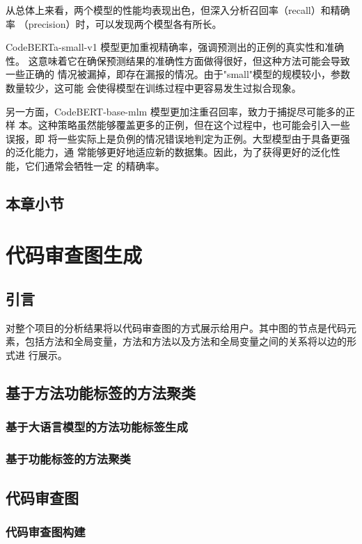 从总体上来看，两个模型的性能均表现出色，但深入分析召回率（recall）和精确率
（precision）时，可以发现两个模型各有所长。

CodeBERTa-small-v1 模型更加重视精确率，强调预测出的正例的真实性和准确性。
这意味着它在确保预测结果的准确性方面做得很好，但这种方法可能会导致一些正确的
情况被漏掉，即存在漏报的情况。由于"small"模型的规模较小，参数数量较少，这可能
会使得模型在训练过程中更容易发生过拟合现象。

另一方面，CodeBERT-base-mlm 模型更加注重召回率，致力于捕捉尽可能多的正样
本。这种策略虽然能够覆盖更多的正例，但在这个过程中，也可能会引入一些误报，即
将一些实际上是负例的情况错误地判定为正例。大型模型由于具备更强的泛化能力，通
常能够更好地适应新的数据集。因此，为了获得更好的泛化性能，它们通常会牺牲一定
的精确率。

\section{本章小节}



\chapter{代码审查图生成}
\section{引言}
对整个项目的分析结果将以代码审查图的方式展示给用户。其中图的节点是代码元
素，包括方法和全局变量，方法和方法以及方法和全局变量之间的关系将以边的形式进
行展示。

\section{基于方法功能标签的方法聚类}
\subsection{基于大语言模型的方法功能标签生成}
\subsection{基于功能标签的方法聚类}

\section{代码审查图}
\subsection{代码审查图构建}
